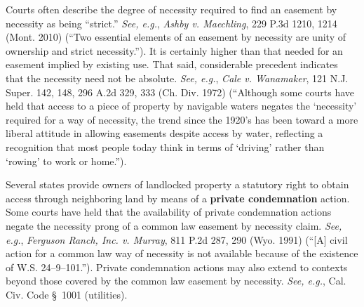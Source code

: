 Courts often describe the degree of necessity required to find an easement by
necessity as being ``strict.'' \textit{See, e.g.}, \emph{Ashby v. Maechling},
229 P.3d 1210, 1214 (Mont. 2010) (``Two essential elements of an easement by
necessity are unity of ownership and strict necessity.''). It is certainly
higher than that needed for an easement implied by existing use. That said,
considerable precedent indicates that the necessity need not be absolute.
\textit{See, e.g.}, \emph{Cale v. Wanamaker}, 121 N.J. Super. 142, 148, 296 A.2d
329, 333 (Ch. Div. 1972) (``Although some courts have held that access to a
piece of property by navigable waters negates the `necessity' required for a way
of necessity, the trend since the 1920's has been toward a more liberal attitude
in allowing easements despite access by water, reflecting a recognition that
most people today think in terms of `driving' rather than `rowing' to work or
home.'').



\item Several states provide owners of landlocked property a statutory right to
obtain access through neighboring land by means of a \textbf{private
condemnation} action. Some courts have held that the availability of private
condemnation actions negate the necessity prong of a common law easement by
necessity claim. \textit{See, e.g.}, \emph{Ferguson Ranch, Inc. v. Murray}, 811
P.2d 287, 290 (Wyo. 1991) (``[A] civil action for a common law way of necessity
is not available because of the existence of W.S. 24--9--101.''). Private
condemnation actions may also extend to contexts beyond those covered by the
common law easement by necessity. \textit{See, e.g.}, Cal. Civ. Code \S~1001
(utilities).

